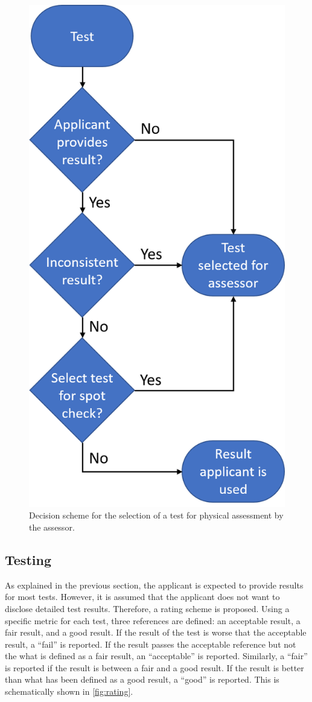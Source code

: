 \documentclass[twoside,twocolumn,9pt]{article}
\theoremstyle{plain}
\theoremstyle{remark}\newtheorem{remarkenv}{Remark}        %
\begin{document}
\begin{figure}
	\centering
	\includegraphics[width=.65\linewidth]{test_selection}
	\caption{Decision scheme for the selection of a test for physical assessment by the assessor.}
	\label{fig:selection}
\end{figure}



\subsection{Testing}
\label{sec:testing}

As explained in the previous section, the applicant is expected to provide results for most tests. However, it is assumed that the applicant does not want to disclose detailed test results. Therefore, a rating scheme is proposed. Using a specific metric for each test, three references are defined: an acceptable result, a fair result, and a good result. If the result of the test is worse that the acceptable result, a ``fail'' is reported. If the result passes the acceptable reference but not the what is defined as a fair result, an ``acceptable'' is reported. Similarly, a ``fair'' is reported if the result is between a fair and a good result. If the result is better than what has been defined as a good result, a ``good'' is reported. This is schematically shown in \cref{fig:rating}. 
\end{document}
